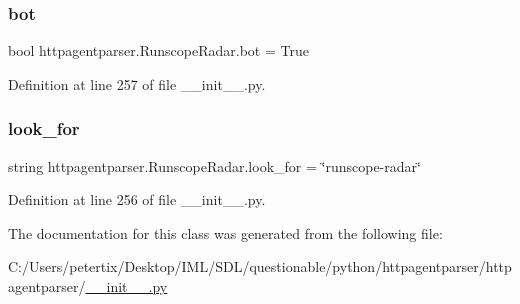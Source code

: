 \subsubsection{\texorpdfstring{bot}{bot}}
{\footnotesize\ttfamily bool httpagentparser.\+Runscope\+Radar.\+bot = True\hspace{0.3cm}{\ttfamily [static]}}



Definition at line 257 of file \+\_\+\+\_\+init\+\_\+\+\_\+.\+py.

\hypertarget{classhttpagentparser_1_1_runscope_radar_abf5a8780ab5a1d8addcefc8ef5ea45c3}{}\label{classhttpagentparser_1_1_runscope_radar_abf5a8780ab5a1d8addcefc8ef5ea45c3} 
\subsubsection{\texorpdfstring{look\+\_\+for}{look\_for}}
{\footnotesize\ttfamily string httpagentparser.\+Runscope\+Radar.\+look\+\_\+for = \char`\"{}runscope-\/radar\char`\"{}\hspace{0.3cm}{\ttfamily [static]}}



Definition at line 256 of file \+\_\+\+\_\+init\+\_\+\+\_\+.\+py.



The documentation for this class was generated from the following file\+:\begin{DoxyCompactItemize}
\item 
C\+:/\+Users/petertix/\+Desktop/\+I\+M\+L/\+S\+D\+L/questionable/python/httpagentparser/httpagentparser/\hyperlink{____init_____8py}{\+\_\+\+\_\+init\+\_\+\+\_\+.\+py}\end{DoxyCompactItemize}
